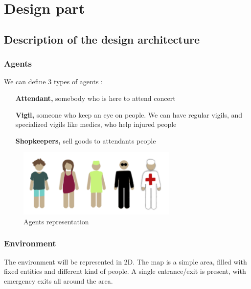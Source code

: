 \chapter{Design part}

\section{Description of the design architecture}

\subsection{Agents}

We can define 3 types of agents :\\

\begin{itemize}
	\item[{\bf Attendant,}] somebody who is here to attend concert
	\item[{\bf Vigil,}] someone who keep an eye on people. We can have regular
	vigils, and specialized vigils like medics, who help injured people
	\item[{\bf Shopkeepers,}] sell goods to attendants people
\end{itemize}

\begin{figure}[h]
	\begin{center}
		\includegraphics[width=0.7\textwidth]{img/agents.png}
	\end{center}
	\caption{Agents representation}
\end{figure}

\subsection{Environment}

The environment will be represented in 2D. The map is a simple area, filled with
fixed entities and different kind of people. A single entrance/exit is present,
with emergency exits all around the area.\\


